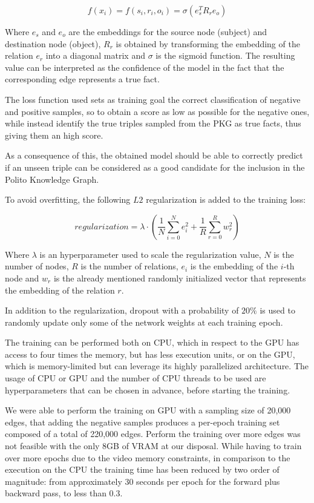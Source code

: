 \documentclass[%
    corpo=13.5pt,
    twoside,
    oldstyle,
    tipotesi=magistrale,
    greek,
    evenboxes
]{toptesi}
\begin{document}
\begin{equation}
    f(x_i) = f(s_i,r_i,o_i) = \sigma \left( e_s^T R_r e_o \right)
\end{equation}

Where $e_s$ and $e_o$ are the embeddings for the source node (subject) and
destination node (object), $R_r$ is obtained by transforming the embedding
of the relation $e_r$ into a diagonal matrix and $\sigma$ is the
sigmoid function.
The resulting value can be interpreted as the confidence of the model in
the fact that the corresponding edge represents a true fact.

The loss function used sets as training goal the correct classification of
negative and positive samples, so to obtain a score as low as possible for the
negative ones, while instead identify the true triples sampled from the PKG as
true facts, thus giving them an high score.

As a consequence of this, the obtained model should be able to correctly
predict if an unseen triple can be considered as a good candidate for the
inclusion in the Polito Knowledge Graph.

To avoid overfitting, the following $L2$ regularization is added to the
training loss:

\begin{equation}
    regularization = \lambda \cdot \left(\frac{1}{N}\sum_{i=0}^{N} e_{i}^2 + \frac{1}{R}\sum_{r=0}^{R} w_{r}^2 \right)
\end{equation}

Where $\lambda$ is an hyperparameter used to scale the regularization value, $N$
is the number of nodes, $R$ is the number of relations, $e_i$ is the embedding
of the $i$-th node and $w_r$ is the already mentioned randomly initialized
vector that represents the embedding of the relation $r$.

In addition to the regularization, dropout with a probability of $20\%$ is used
to randomly update only some of the network weights at each training epoch.

The training can be performed both on CPU, which in respect to the GPU has
access to four times the memory, but has less execution units, or on the GPU,
which is memory-limited but can leverage its highly parallelized architecture.
The usage of CPU or GPU and the number of CPU threads to be used are
hyperparameters that can be chosen in advance, before starting the training.

We were able to perform the training on GPU with a sampling size of 20,000
edges, that adding the negative samples produces a per-epoch training set
composed of a total of 220,000 edges.
Perform the training over more edges was not feasible with the only 8GB of VRAM
at our disposal.
While having to train over more epochs due to the video memory constraints, in
comparison to the execution on the CPU the training time has been reduced by two
order of magnitude: from approximately 30 seconds per epoch for the forward
plus backward pass, to less than 0.3.
\end{document}
